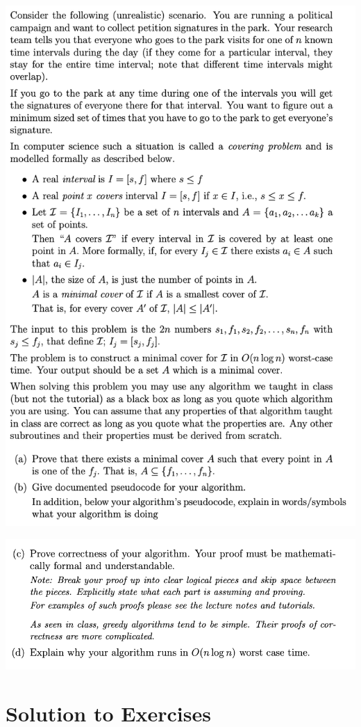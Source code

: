 \begin{spacing}{1.3}
    \includegraphics[scale=1.05]{images/07-exercise-2021f-hw-question.png}

    \newpage
    \includegraphics[scale=1.05]{images/07-exercise-2021f-hw-question2.png}



    \newpage
    \section{Solution to Exercises}


\end{spacing}
